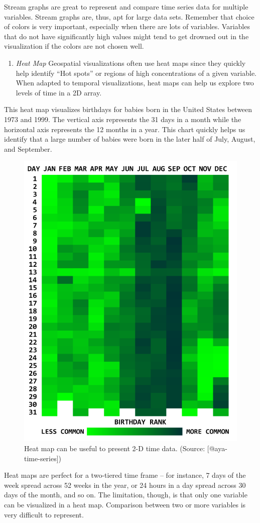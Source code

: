\documentclass[]{book}
\providecommand{\tightlist}{%
  \setlength{\itemsep}{0pt}\setlength{\parskip}{0pt}}
\theoremstyle{definition}
\theoremstyle{definition}
\theoremstyle{definition}
\theoremstyle{remark}
\begin{document}
Stream graphs are great to represent and compare time series data for
multiple variables. Stream graphs are, thus, apt for large data sets.
Remember that choice of colors is very important, especially when there
are lots of variables. Variables that do not have significantly high
values might tend to get drowned out in the visualization if the colors
are not chosen well.

\begin{enumerate}
\def\labelenumi{\arabic{enumi}.}
\setcounter{enumi}{5}
\tightlist
\item
  \emph{Heat Map} Geospatial visualizations often use heat maps since
  they quickly help identify ``Hot spots'' or regions of high
  concentrations of a given variable. When adapted to temporal
  visualizations, heat maps can help us explore two levels of time in a
  2D array.
\end{enumerate}

This heat map visualizes birthdays for babies born in the United States
between 1973 and 1999. The vertical axis represents the 31 days in a
month while the horizontal axis represents the 12 months in a year. This
chart quickly helps us identify that a large number of babies were born
in the later half of July, August, and September.

\begin{figure}

{\centering \includegraphics[width=0.4\linewidth]{images/aya-heat-map} 

}

\caption{Heat map can be useful to present 2-D time data. (Source: [@aya-time-series])}\label{fig:aya-heat-map}
\end{figure}

Heat maps are perfect for a two-tiered time frame -- for instance, 7
days of the week spread across 52 weeks in the year, or 24 hours in a
day spread across 30 days of the month, and so on. The limitation,
though, is that only one variable can be visualized in a heat map.
Comparison between two or more variables is very difficult to represent.
\end{document}

